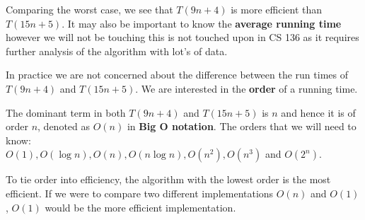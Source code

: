 
Comparing the worst case, we see that $T(9n + 4)$ is more efficient than $T(15n + 5)$. It may also be important to know the \textbf{average running time} however we will not be touching this is not touched upon in CS 136 as it requires further analysis of the algorithm with lot's of data.\\


In practice we are not concerned about the difference between the run times of $T(9n + 4)$ and $T(15n + 5)$. We are interested in the \textbf{order} of a running time.\\



The dominant term in both $T(9n + 4)$ and $T(15n + 5)$ is $n$ and hence it is of order $n$, denoted as $O(n)$ in \textbf{Big O notation}. The orders that we will need to know:\\

$O(1), O(\log{n}), O(n), O(n\log{n}), O(n^{2}), O(n^{3})$ and $O(2^{n})$.\\


To tie order into efficiency, the algorithm with the lowest order is the most efficient. If we were to compare two different implementations $O(n)$ and $O(1)$, $O(1)$ would be the more efficient implementation.\\

